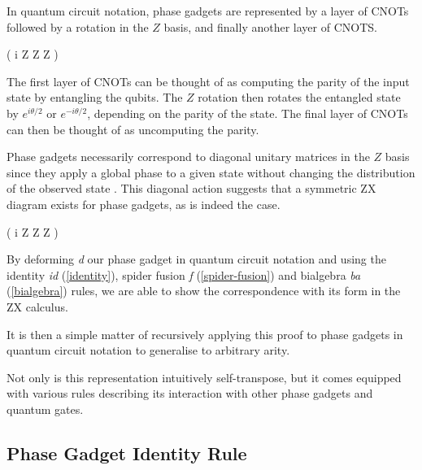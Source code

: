 In quantum circuit notation, phase gadgets are represented by a layer of CNOTs followed by a rotation in the $Z$ basis, and finally another layer of CNOTS.

{ \left( i  Z \otimes Z \otimes Z \right)}

The first layer of CNOTs can be thought of as computing the parity of the input state by entangling the qubits. The $Z$ rotation then rotates the entangled state by $e^{i\theta/2}$ or $e^{-i\theta/2}$, depending on the parity of the state. The final layer of CNOTs can then be thought of as uncomputing the parity.

Phase gadgets necessarily correspond to diagonal unitary matrices in the $Z$ basis since they apply a global phase to a given state without changing the distribution of the observed state \cite{Yeung2020}. This diagonal action suggests that a symmetric ZX diagram exists for phase gadgets, as is indeed the case.

{ \left( i  Z \otimes Z \otimes Z \right)}


By deforming \textit{d} our phase gadget in quantum circuit notation and using the identity \textit{id} (\ref{identity}), spider fusion \textit{f} (\ref{spider-fusion}) and bialgebra \textit{ba} (\ref{bialgebra}) rules, we are able to show the correspondence with its form in the ZX calculus.


It is then a simple matter of recursively applying this proof to phase gadgets in quantum circuit notation to generalise to arbitrary arity.


Not only is this representation intuitively self-transpose, but it comes equipped with various rules describing its interaction with other phase gadgets and quantum gates.


\subsection{Phase Gadget Identity Rule}%
\label{phase-gadget-identity}

